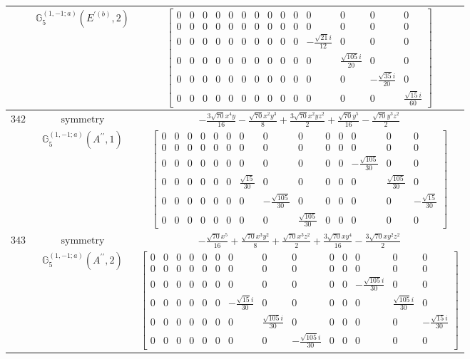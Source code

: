 \documentclass[fleqn,8pt,landscape]{jsarticle}
\begin{document}
\begin{longtable}{ccc}
$  $ & $ \mathbb{G}_{5}^{(1,-1;a)}(E^{\prime(b)},2) $ & $ \begin{bmatrix} 0 & 0 & 0 & 0 & 0 & 0 & 0 & 0 & 0 & 0 & 0 & 0 & 0 & 0 \\ 0 & 0 & 0 & 0 & 0 & 0 & 0 & 0 & 0 & 0 & 0 & 0 & 0 & 0 \\ 0 & 0 & 0 & 0 & 0 & 0 & 0 & 0 & 0 & 0 & - \frac{\sqrt{21} i}{12} & 0 & 0 & 0 \\ 0 & 0 & 0 & 0 & 0 & 0 & 0 & 0 & 0 & 0 & 0 & \frac{\sqrt{105} i}{20} & 0 & 0 \\ 0 & 0 & 0 & 0 & 0 & 0 & 0 & 0 & 0 & 0 & 0 & 0 & - \frac{\sqrt{35} i}{20} & 0 \\ 0 & 0 & 0 & 0 & 0 & 0 & 0 & 0 & 0 & 0 & 0 & 0 & 0 & \frac{\sqrt{15} i}{60} \end{bmatrix} $ \\ \hline
$ 342 $ & $ \text{symmetry} $ & $ - \frac{3 \sqrt{70} x^{4} y}{16} - \frac{\sqrt{70} x^{2} y^{3}}{8} + \frac{3 \sqrt{70} x^{2} y z^{2}}{2} + \frac{\sqrt{70} y^{5}}{16} - \frac{\sqrt{70} y^{3} z^{2}}{2} $ \\
$  $ & $ \mathbb{G}_{5}^{(1,-1;a)}(A^{\prime\prime},1) $ & $ \begin{bmatrix} 0 & 0 & 0 & 0 & 0 & 0 & 0 & 0 & 0 & 0 & 0 & 0 & 0 & 0 \\ 0 & 0 & 0 & 0 & 0 & 0 & 0 & 0 & 0 & 0 & 0 & 0 & 0 & 0 \\ 0 & 0 & 0 & 0 & 0 & 0 & 0 & 0 & 0 & 0 & 0 & - \frac{\sqrt{105}}{30} & 0 & 0 \\ 0 & 0 & 0 & 0 & 0 & 0 & \frac{\sqrt{15}}{30} & 0 & 0 & 0 & 0 & 0 & \frac{\sqrt{105}}{30} & 0 \\ 0 & 0 & 0 & 0 & 0 & 0 & 0 & - \frac{\sqrt{105}}{30} & 0 & 0 & 0 & 0 & 0 & - \frac{\sqrt{15}}{30} \\ 0 & 0 & 0 & 0 & 0 & 0 & 0 & 0 & \frac{\sqrt{105}}{30} & 0 & 0 & 0 & 0 & 0 \end{bmatrix} $ \\ \hline
$ 343 $ & $ \text{symmetry} $ & $ - \frac{\sqrt{70} x^{5}}{16} + \frac{\sqrt{70} x^{3} y^{2}}{8} + \frac{\sqrt{70} x^{3} z^{2}}{2} + \frac{3 \sqrt{70} x y^{4}}{16} - \frac{3 \sqrt{70} x y^{2} z^{2}}{2} $ \\
$  $ & $ \mathbb{G}_{5}^{(1,-1;a)}(A^{\prime\prime},2) $ & $ \begin{bmatrix} 0 & 0 & 0 & 0 & 0 & 0 & 0 & 0 & 0 & 0 & 0 & 0 & 0 & 0 \\ 0 & 0 & 0 & 0 & 0 & 0 & 0 & 0 & 0 & 0 & 0 & 0 & 0 & 0 \\ 0 & 0 & 0 & 0 & 0 & 0 & 0 & 0 & 0 & 0 & 0 & - \frac{\sqrt{105} i}{30} & 0 & 0 \\ 0 & 0 & 0 & 0 & 0 & 0 & - \frac{\sqrt{15} i}{30} & 0 & 0 & 0 & 0 & 0 & \frac{\sqrt{105} i}{30} & 0 \\ 0 & 0 & 0 & 0 & 0 & 0 & 0 & \frac{\sqrt{105} i}{30} & 0 & 0 & 0 & 0 & 0 & - \frac{\sqrt{15} i}{30} \\ 0 & 0 & 0 & 0 & 0 & 0 & 0 & 0 & - \frac{\sqrt{105} i}{30} & 0 & 0 & 0 & 0 & 0 \end{bmatrix} $ \\ \hline

\end{longtable}
\end{document}
